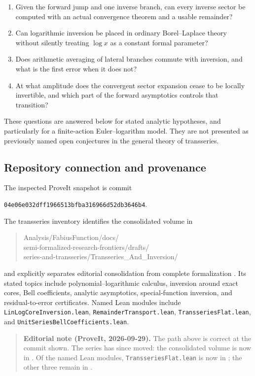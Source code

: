 \documentclass[11pt,a4paper]{article}
\numberwithin{equation}{section}
\theoremstyle{definition}
\theoremstyle{remark}
\begin{document}
\begin{enumerate}[label=(\roman*)]
\item Given the forward jump and one inverse branch, can every inverse sector be computed with an actual convergence theorem and a usable remainder?
\item Can logarithmic inversion be placed in ordinary Borel--Laplace theory without silently treating $\log x$ as a constant formal parameter?
\item Does arithmetic averaging of lateral branches commute with inversion, and what is the first error when it does not?
\item At what amplitude does the convergent sector expansion cease to be locally invertible, and which part of the forward asymptotics controls that transition?
\end{enumerate}

These questions are answered below for stated analytic hypotheses, and particularly for a finite-action Euler--logarithm model. They are not presented as previously named open conjectures in the general theory of transseries.

\subsection{Repository connection and provenance}
The inspected ProveIt snapshot is commit
\begin{center}
\texttt{04e06e032dff1966513bfba316966d52db3646b4}.
\end{center}
The transseries inventory identifies the consolidated volume in
\begin{quote}\small\ttfamily
Analysis/FabiusFunction/docs/\\
semi-formalized-research-frontiers/drafts/\\
series-and-transseries/Transseries\_And\_Inversion/
\end{quote}
and explicitly separates editorial consolidation from complete formalization \cite{repo}. Its stated topics include polynomial--logarithmic calculus, inversion around exact cores, Bell coefficients, analytic asymptotics, special-function inversion, and residual-to-error certificates. Named Lean modules include \texttt{LinLogCoreInversion.lean}, \texttt{RemainderTransport.lean}, \texttt{TransseriesFlat.lean}, and \texttt{UnitSeriesBellCoefficients.lean}.

\begin{quote}\small\textbf{Editorial note (ProveIt, 2026-09-29).} The path above is correct at the commit shown. The series has since moved: the consolidated volume is now in . Of the named Lean modules, \texttt{TransseriesFlat.lean} is now in ; the other three remain in .\end{quote}
\end{document}
